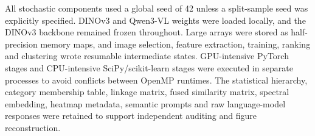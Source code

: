 All stochastic components used a global seed of 42 unless a split-sample seed
was explicitly specified. DINOv3 and Qwen3-VL weights were loaded locally, and
the DINOv3 backbone remained frozen throughout. Large arrays were stored as
half-precision memory maps, and image selection, feature extraction, training,
ranking and clustering wrote resumable intermediate states. GPU-intensive
PyTorch stages and CPU-intensive SciPy/scikit-learn stages were executed in
separate processes to avoid conflicts between OpenMP runtimes. The statistical
hierarchy, category membership table, linkage matrix, fused similarity matrix,
spectral embedding, heatmap metadata, semantic prompts and raw language-model
responses were retained to support independent auditing and figure
reconstruction.
